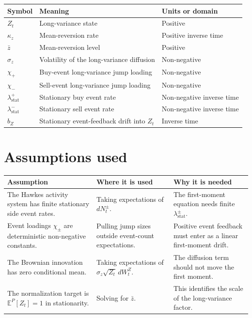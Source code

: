 \documentclass[11pt]{article}
\begin{document}
\begin{tabularx}{\textwidth}{lXX}
\toprule
Symbol & Meaning & Units or domain\\
\midrule
\(Z_t\) & Long-variance state & Positive\\
\(\kappa_z\) & Mean-reversion rate & Positive inverse time\\
\(\bar z\) & Mean-reversion level & Positive\\
\(\sigma_z\) & Volatility of the long-variance diffusion & Non-negative\\
\(\chi_+\) & Buy-event long-variance jump loading & Non-negative\\
\(\chi_-\) & Sell-event long-variance jump loading & Non-negative\\
\(\lambda_{\mathrm{stat}}^+\) & Stationary buy event rate & Non-negative inverse time\\
\(\lambda_{\mathrm{stat}}^-\) & Stationary sell event rate & Non-negative inverse time\\
\(b_Z\) & Stationary event-feedback drift into \(Z_t\) & Inverse time\\
\bottomrule
\end{tabularx}

\section{Assumptions used}

\begin{tabularx}{\textwidth}{XXX}
\toprule
Assumption & Where it is used & Why it is needed\\
\midrule
The Hawkes activity system has finite stationary side event rates.
& Taking expectations of \(dN_t^\pm\).
& The first-moment equation needs finite \(\lambda_{\mathrm{stat}}^\pm\).\\
Event loadings \(\chi_\pm\) are deterministic non-negative constants.
& Pulling jump sizes outside event-count expectations.
& Positive event feedback must enter as a linear first-moment drift.\\
The Brownian innovation has zero conditional mean.
& Taking expectations of \(\sigma_z\sqrt{Z_t}\,dW_t^Z\).
& The diffusion term should not move the first moment.\\
The normalization target is \(\mathbb E^P[Z_t]=1\) in stationarity.
& Solving for \(\bar z\).
& This identifies the scale of the long-variance factor.\\
\bottomrule
\end{tabularx}
\end{document}
